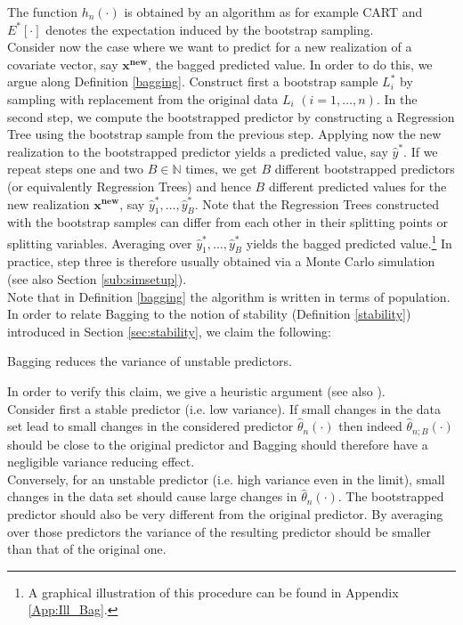The function $h_n(\cdot)$ is obtained by an algorithm as for example CART and $E^*[\cdot]$ denotes the expectation induced by the bootstrap sampling.\\
Consider now the case where we want to predict for a new realization of a covariate vector, say $\mathbf{x^{new}}$, the bagged predicted value.
In order to do this, we argue along Definition \ref{bagging}. Construct first a bootstrap sample $L_i^*$ by sampling with replacement from the original data $L_i$ $(i=1, \dots, n)$.
In the second step, we compute the bootstrapped predictor by constructing a Regression Tree using the bootstrap sample from the previous step.
Applying now the new realization to the bootstrapped predictor yields a  predicted value, say $\hat{y}^*$.
If we repeat steps one and two $B \in \mathbb{N}$ times, we get $B$ different bootstrapped predictors (or equivalently Regression Trees) and hence $B$ different predicted values for the new realization $\mathbf{x^{new}}$, say $\hat{y}_1^*, \dots, \hat{y}_B^*$.
Note that the Regression Trees constructed with the bootstrap samples can differ from each other in their splitting points or splitting variables.
Averaging over $\hat{y}_1^*, \dots, \hat{y}_B^*$ yields the bagged predicted value.\footnote{A graphical illustration of this procedure can be found in Appendix \ref{App:Ill_Bag}.}
In practice, step three is therefore usually obtained via a Monte Carlo simulation (see also Section \ref{sub:simsetup}).\\
Note that in Definition \ref{bagging} the algorithm is written in terms of population.\\
In order to relate Bagging to the notion of stability (Definition \ref{stability}) introduced in Section \ref{sec:stability}, we claim the following:
\begin{claim}
Bagging reduces the variance of unstable predictors.
\end{claim}
\noindent In order to verify this claim, we give a heuristic argument (see also \cite{Breiman1996}).\\
Consider first a stable predictor (i.e. low variance).
If small changes in the data set lead to small changes in the considered predictor $\hat{\theta}_{n}(\cdot)$ then indeed $\hat{\theta}_{n;B}(\cdot)$ should be close to the original predictor and Bagging should therefore have a negligible variance reducing effect.\\
Conversely, for an unstable predictor (i.e. high variance even in the limit), small changes in the data set should cause large changes in $\hat{\theta}_{n}(\cdot)$.
The bootstrapped predictor should also be very different from the original predictor.
By averaging over those predictors the variance of the resulting predictor should be smaller than that of the original one.

